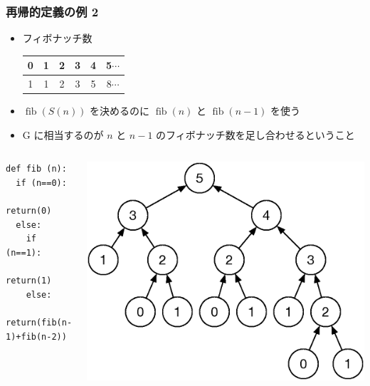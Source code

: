 \begin{frame}[fragile]
\frametitle{再帰的定義の例 2}
  \begin{itemize}
\item フィボナッチ数\\
    \begin{tabular}{c|c|c|c|c|c}
0&1&2&3&4&5$\cdots$\\
\hline
1&1&2&3&5&8$\cdots$
    \end{tabular}
\item \({\mathop{\mathrm{fib}}}(S(n))\) を決めるのに \({\mathop{\mathrm{fib}}}(n)\) と \({\mathop{\mathrm{fib}}}(n-1)\) を使う
\item G に相当するのが \(n\) と \(n-1\) のフィボナッチ数を足し合わせるということ
  \end{itemize}
  \begin{columns}[c]
    \begin{column}{0.5\textwidth}
      \begin{lstlisting}[caption={フィボナッチ数},label=fib-rec]
def fib (n):
  if (n==0):
    return(0)
  else:
    if (n==1):
      return(1)
    else:
      return(fib(n-1)+fib(n-2))
      \end{lstlisting}
    \end{column}
    \begin{column}{0.45\textwidth}
      \begin{example}[fib\((5)\)]
        \begin{center}
\includegraphics[scale=0.3]{./Figure/elementaryCS-2nd-figFib.eps}
        \end{center}
      \end{example}
    \end{column}
  \end{columns}
\end{frame}
